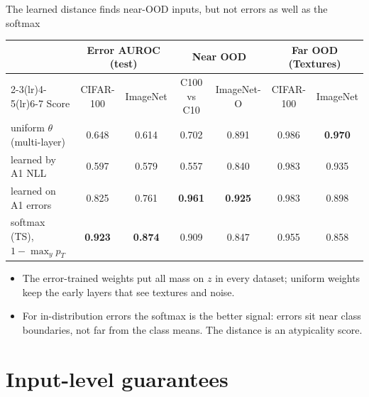 \documentclass[aspectratio=169,11pt]{beamer}
\begin{document}
\begin{frame}{The learned distance finds near-OOD inputs, but not errors as well as the softmax}
  \small
  \centering
  \begin{tabular}{@{}lcccccc@{}}
    \toprule
    & \multicolumn{2}{c}{Error AUROC (test)} & \multicolumn{2}{c}{Near OOD} & \multicolumn{2}{c}{Far OOD (Textures)}\\
    \cmidrule(lr){2-3}\cmidrule(lr){4-5}\cmidrule(lr){6-7}
    Score & CIFAR-100 & ImageNet & C100 vs C10 & ImageNet-O & CIFAR-100 & ImageNet\\
    \midrule
    uniform $\theta$ (multi-layer) & 0.648 & 0.614 & 0.702 & 0.891 & 0.986 & \textbf{0.970}\\
    learned by A1 NLL & 0.597 & 0.579 & 0.557 & 0.840 & 0.983 & 0.935\\
    learned on A1 errors & 0.825 & 0.761 & \textbf{0.961} & \textbf{0.925} & 0.983 & 0.898\\
    \midrule
    softmax (TS), $1-\max_y p_T$ & \textbf{0.923} & \textbf{0.874} & 0.909 & 0.847 & 0.955 & 0.858\\
    \bottomrule
  \end{tabular}
  \par\medskip\raggedright
  \begin{itemize}
    \item The error-trained weights put all mass on $z$ in every dataset; uniform weights keep the early layers that see textures and noise.
    \item For in-distribution errors the softmax is the better signal: errors sit near class boundaries, not far from the class means. The distance is an atypicality score.
  \end{itemize}
\end{frame}

\section{Input-level guarantees}
\end{document}
